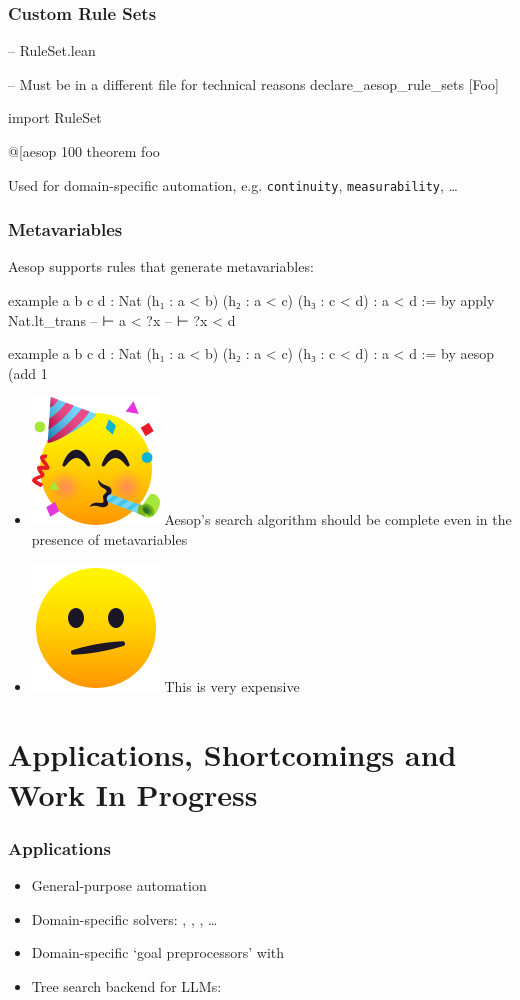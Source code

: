 \documentclass[xetex]{beamer}
\newlength{\emojiheight}
\newcommand{\good}{\includegraphics[height=\emojiheight]{images/1f973}}
\newcommand{\bad}{\includegraphics[height=\emojiheight]{images/1fae4}}
\begin{document}
\begin{frame}[fragile]
  \frametitle{Custom Rule Sets}

  \begin{leancode}
    -- RuleSet.lean

    -- Must be in a different file for technical reasons
    declare_aesop_rule_sets [Foo]
  \end{leancode}

  \pause

  \begin{leancode}
    import RuleSet

    @[aesop 100%
    theorem foo
  \end{leancode}

  \pause

  Used for domain-specific automation, e.g. \texttt{continuity}, \texttt{measurability}, \dots
\end{frame}

\begin{frame}[fragile]
  \frametitle{Metavariables}

  Aesop supports rules that generate metavariables:

  \begin{leancode}
    example {a b c d : Nat} (h₁ : a < b)
        (h₂ : a < c) (h₃ : c < d) : a < d := by
      apply Nat.lt_trans
      -- ⊢ a < ?x
      -- ⊢ ?x < d

    example {a b c d : Nat} (h₁ : a < b)
        (h₂ : a < c) (h₃ : c < d) : a < d := by
      aesop (add 1%
  \end{leancode}

  \pause

  \begin{itemize}[<+->]
    \item \good{} Aesop's search algorithm should be complete even in the presence of metavariables
    \item \bad{} This is very expensive
  \end{itemize}
\end{frame}

\section{Applications, Shortcomings and Work In Progress}

\begin{frame}
  \frametitle{Applications}

  \begin{itemize}[<+->]
    \item General-purpose automation
    \item Domain-specific solvers: , , , \dots
    \item Domain-specific \enquote*{goal preprocessors} with 
    \item Tree search backend for LLMs: 
  \end{itemize}
\end{frame}
\end{document}
